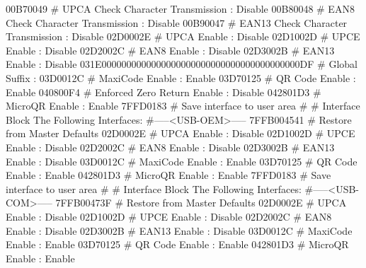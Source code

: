 00B70049                       # UPCA Check Character Transmission        :    Disable
00B80048                       # EAN8 Check Character Transmission        :    Disable
00B90047                       # EAN13 Check Character Transmission       :    Disable
02D0002E                       # UPCA Enable                              :    Disable
02D1002D                       # UPCE Enable                              :    Disable
02D2002C                       # EAN8 Enable                              :    Disable
02D3002B                       # EAN13 Enable                             :    Disable
031E0000000000000000000000000000000000000000DF # Global Suffix                            :           
03D0012C                       # MaxiCode Enable                          :     Enable
03D70125                       # QR Code Enable                           :     Enable
040800F4                       # Enforced Zero Return Enable              :    Disable
042801D3                       # MicroQR Enable                           :     Enable
7FFD0183                       # Save interface to user area
#
# Interface Block The Following Interfaces:
#-----<USB-OEM>-----
7FFB004541                     # Restore from Master Defaults
02D0002E                       # UPCA Enable                              :    Disable
02D1002D                       # UPCE Enable                              :    Disable
02D2002C                       # EAN8 Enable                              :    Disable
02D3002B                       # EAN13 Enable                             :    Disable
03D0012C                       # MaxiCode Enable                          :     Enable
03D70125                       # QR Code Enable                           :     Enable
042801D3                       # MicroQR Enable                           :     Enable
7FFD0183                       # Save interface to user area
#
# Interface Block The Following Interfaces:
#-----<USB-COM>-----
7FFB00473F                     # Restore from Master Defaults
02D0002E                       # UPCA Enable                              :    Disable
02D1002D                       # UPCE Enable                              :    Disable
02D2002C                       # EAN8 Enable                              :    Disable
02D3002B                       # EAN13 Enable                             :    Disable
03D0012C                       # MaxiCode Enable                          :     Enable
03D70125                       # QR Code Enable                           :     Enable
042801D3                       # MicroQR Enable                           :     Enable
